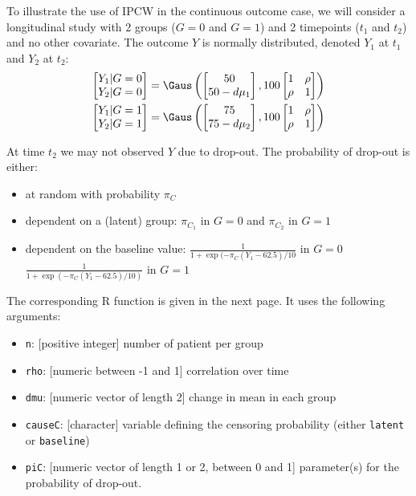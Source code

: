 \documentclass[12pt]{article}
\begin{document}
To illustrate the use of IPCW in the continuous outcome case, we will
consider a longitudinal study with 2 groups (\(G=0\) and \(G=1\)) and
2 timepoints (\(t_1\) and \(t_2\)) and no other covariate. The outcome
\(Y\) is normally distributed, denoted \(Y_1\) at \(t_1\) and \(Y_2\)
at \(t_2\):
\begin{align*}
\begin{bmatrix}
Y_1 | G=0 \\ Y_2 |G=0
\end{bmatrix} &= \Gaus\left(
\begin{bmatrix}
50 \\ 50-d\mu_1
\end{bmatrix},100 \begin{bmatrix}
1 & \rho \\ \rho & 1
\end{bmatrix}
\right) \\
\begin{bmatrix}
Y_1 | G=1 \\ Y_2 |G=1
\end{bmatrix} &= \Gaus\left(
\begin{bmatrix}
75 \\ 75-d\mu_2
\end{bmatrix},100 \begin{bmatrix}
1 & \rho \\ \rho & 1
\end{bmatrix}
\right)
\end{align*}

At time \(t_2\) we may not observed \(Y\) due to drop-out. The
probability of drop-out is either:
\begin{itemize}
\item at random with probability \(\pi_C\)
\item dependent on a (latent) group: \(\pi_{C_1}\) in \(G=0\) and \(\pi_{C_2}\) in \(G=1\)
\item dependent on the baseline value: \(\frac{1}{1+\exp(-\pi_{C}(Y_1-62.5)/10}\) in \(G=0\) \newline \hphantom{on the basleine value:} \(\frac{1}{1+\exp(-\pi_{C}(Y_1-62.5)/10)}\) in \(G=1\)
\end{itemize}

\bigskip

The corresponding R function is given in the next page. It uses the following arguments:
\begin{itemize}
\item \texttt{n}: [positive integer] number of patient per group
\item \texttt{rho}: [numeric between -1 and 1] correlation over time
\item \texttt{dmu}: [numeric vector of length 2] change in mean in each group
\item \texttt{causeC}: [character] variable defining the censoring probability \newline (either \texttt{latent} or \texttt{baseline})
\item \texttt{piC}: [numeric vector of length 1 or 2, between 0 and 1] parameter(s) for the probability of drop-out.
\end{itemize}
\end{document}
